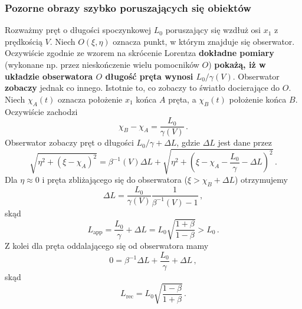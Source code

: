 \documentclass[../main.tex]{subfiles}
\begin{document}
\subsubsection{Pozorne obrazy szybko poruszających się obiektów}
Rozważmy pręt o długości spoczynkowej \(L_0\) poruszający się wzdłuż osi \(x_1\) z prędkością \(V\).
Niech \(O(\xi,\eta)\) oznacza punkt, w którym znajduje się obserwator. Oczywiście zgodnie ze wzorem
na skrócenie Lorentza \textbf{dokładne pomiary} (wykonane np. przez nieskończenie wielu pomocników
\(O\)) \textbf{pokażą, iż w układzie obserwatora \(O\) długość pręta wynosi \(L_0/\gamma(V)\)}.
Obserwator \textbf{zobaczy} jednak co innego. Istotnie to, co zobaczy to światło docierające do
\(O\). Niech \(\chi_A(t)\) oznacza położenie \(x_1\) końca \(A\) pręta, a \(\chi_B(t)\) położenie
końca \(B\). Oczywiście zachodzi
\begin{equation*}
    \chi_B-\chi_A=\frac{L_0}{\gamma(V)}\,.
\end{equation*}
Obserwator zobaczy pręt o długości \(L_0/\gamma+\Delta L\), gdzie \(\Delta L\) jest dane przez
\begin{equation*}
    \sqrt{\eta^2+(\xi-\chi_A)^2}=\beta^{-1}(V)\Delta L+\sqrt{\eta^2+\left(\xi-\chi_A-\frac{L_0}{\gamma}-\Delta L\right)^2}\,.
\end{equation*}
Dla \(\eta\approx 0\) i pręta zbliżającego się do obserwatora (\(\xi>\chi_B+\Delta L\)) otrzymujemy
\begin{equation*}
    \Delta L=\frac{L_0}{\gamma(V)}\frac{1}{\beta^{-1}(V)-1}\,,
\end{equation*}
skąd
\begin{equation*}
    L_\text{app}=\frac{L_0}{\gamma}+\Delta L=L_0\sqrt{\frac{1+\beta}{1-\beta}}>L_0\,.
\end{equation*}
Z kolei dla pręta oddalającego się od obserwatora mamy
\begin{equation*}
    0=\beta^{-1}\Delta L+\frac{L_0}{\gamma}+\Delta L\,,
\end{equation*}
skąd
\begin{equation*}
    L_\text{rec}=L_0\sqrt{\frac{1-\beta}{1+\beta}}\,.
\end{equation*}
\end{document}
